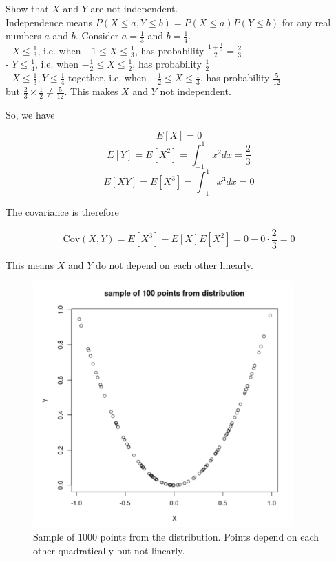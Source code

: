 \documentclass[12pt, a4paper]{article}
\newcounter{exa}
\begin{document}
\begin{texample}
Show that $X$ and $Y$ are not independent. \\

Independence means $P(X\le a, Y\le b)=P(X\le a) P(Y\le b)$ for any real numbers $a$ and $b$. Consider $a=\frac13$ and $b=\frac 14$. \\

- $X \le \frac 13$, i.e. when $-1 \le X \le \frac13$, has probability $\frac{1+\frac13}{2}=\frac23$ \\
- $Y \le \frac 14$, i.e. when $-\frac12 \le X \le \frac12$, has probability $\frac12$ \\
- $X \le \frac 13, Y \le \frac 14$ together, i.e. when $-\frac12 \le X \le \frac13$, has probability $\frac5{12}$ \\

but $\frac23 \times \frac12 \not=\frac5{12}$. This makes $X$ and $Y$ not independent.
\end{texample}

So, we have

$$E[X] = 0$$
$$E[Y] = E[X^2] = \int_{-1}^{1} x^2  dx = \frac23$$
$$E[XY] = E[X^3] = \int_{-1}^{1} x^3 dx = 0$$

The covariance is therefore

\[ \text{Cov}(X,Y) = E[X^3] - E[X] E[X^2] = 0 - 0 \cdot \frac23 = 0 \]

This means $X$ and $Y$ do not depend on each other linearly.

\begin{figure}[H]
\centering
\includegraphics[width=100mm]{22.png}
\caption{Sample of $1000$ points from the distribution. Points depend on each other quadratically but not linearly.}
\end{figure}
\end{document}
